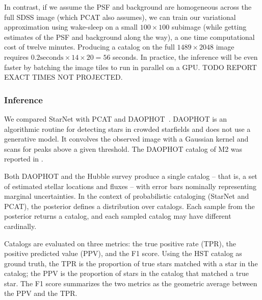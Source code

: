In contrast, if we assume the PSF and background are homogeneous 
across the full SDSS image (which PCAT also assumes), we can 
train our variational approximation using wake-sleep 
on a small $100 \times 100$ subimage
(while getting estimates of the PSF and background along the way),
a one time computational cost of twelve minutes. 
Producing a catalog on the full $1489 \times 2048$ image requires
$0.2\text{seconds} \times 14 \times 20 = 56$ seconds. In practice, 
the inference will be even faster by batching the image tiles to run in parallel on a GPU. TODO REPORT EXACT TIMES NOT PROJECTED. 



\subsubsection{Inference}
\label{sec:results_on_m2_inference}
We compared StarNet with PCAT and DAOPHOT~\cite{stetson2987daophot}. 
DAOPHOT is an algorithmic routine for detecting stars in crowded starfields and does not use a generative model. 
It convolves the observed image with a Gaussian kernel and scans for peaks above a given threshold. 
The DAOPHOT catalog of M2 was reported in 
\cite{An_2008_m2}. 

Both DAOPHOT and the Hubble survey produce a single catalog -- that is, a set of estimated stellar locations and fluxes -- with
error bars nominally representing marginal uncertainties.
In the context of probabilistic cataloging (StarNet and PCAT), the posterior 
defines a distribution over catalogs.
Each sample from the posterior returns a catalog, and each 
sampled catalog may have different cardinally. 

Catalogs are evaluated on three metrics: the true positive rate (TPR), the positive predicted value (PPV), and the F1 score. Using the HST catalog as ground truth, the TPR is the proportion of true stars matched with a star in the catalog;
the PPV is the proportion of stars in the catalog that matched a true star. The F1 score summarizes the two metrics as the geometric average between the PPV and the TPR.

